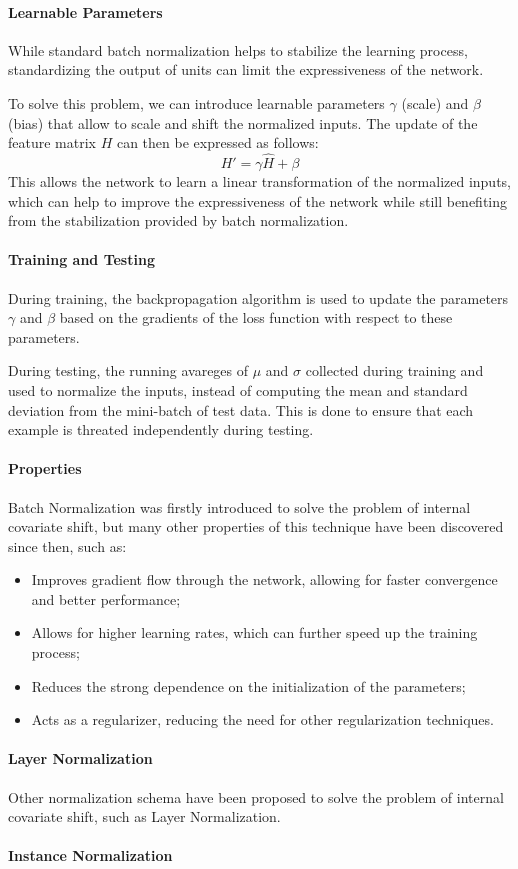 \paragraph{Learnable Parameters}
While standard batch normalization helps to stabilize the learning process, standardizing the output of units can limit the expressiveness of the network.

To solve this problem, we can introduce learnable parameters $\gamma$ (scale) and $\beta$ (bias) that allow to scale and shift the normalized inputs. 
The update of the feature matrix $H$ can then be expressed as follows:
\begin{equation*}
    H' = \gamma \hat{H} + \beta
\end{equation*}
This allows the network to learn a linear transformation of the normalized inputs, which can help to improve the expressiveness 
of the network while still benefiting from the stabilization provided by batch normalization.

\paragraph{Training and Testing}
During training, the backpropagation algorithm is used to update the parameters $\gamma$ and $\beta$ based on the gradients of the loss function with respect to these parameters.

During testing, the running avareges of $\mu$ and $\sigma$ collected during training and used to normalize the inputs, instead of computing the mean and standard deviation from the mini-batch of test data.
This is done to ensure that each example is threated independently during testing.

\paragraph{Properties}
Batch Normalization was firstly introduced to solve the problem of internal covariate shift, 
but many other properties of this technique have been discovered since then, such as:
\begin{itemize}
    \item Improves gradient flow through the network, allowing for faster convergence and better performance;
    \item Allows for higher learning rates, which can further speed up the training process;
    \item Reduces the strong dependence on the initialization of the parameters;
    \item Acts as a regularizer, reducing the need for other regularization techniques.
\end{itemize}

\paragraph{Layer Normalization}
Other normalization schema have been proposed to solve the problem of internal covariate shift, such as Layer Normalization. 

\paragraph{Instance Normalization}

